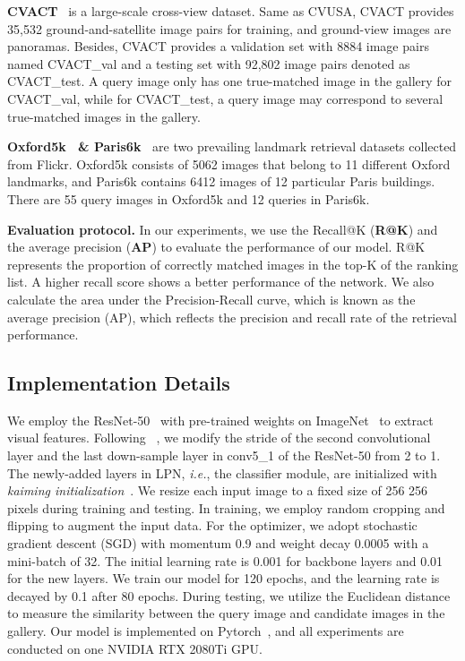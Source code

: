 \documentclass[journal]{IEEEtran}
\def\ie{\emph{i.e.}}
\begin{document}
\textbf{CVACT}~\cite{liu_lending_2019} is a large-scale cross-view dataset. Same as CVUSA, CVACT provides 35,532 ground-and-satellite image pairs for training, and ground-view images are panoramas. Besides, CVACT provides a validation set with 8884 image pairs named CVACT\_val and a testing set with 92,802 image pairs denoted as CVACT\_test. A query image only has one true-matched image in the gallery for CVACT\_val, while for CVACT\_test, a query image may correspond to several true-matched images in the gallery.
\par
\textbf{Oxford5k~\cite{philbin2007object} \& Paris6k~\cite{philbin2008lost}} are two prevailing landmark retrieval datasets collected from Flickr. Oxford5k consists of 5062 images that belong to 11 different Oxford landmarks, and Paris6k contains 6412 images of 12 particular Paris buildings. There are 55 query images in Oxford5k and 12 queries in Paris6k. \par
\textbf{Evaluation protocol.} 
In our experiments, we use the Recall@K (\textbf{R@K}) and the average precision (\textbf{AP}) to evaluate the performance of our model. R@K represents the proportion of correctly matched images in the top-K of the ranking list. A higher recall score shows a better performance of the network. We also calculate the
area under the Precision-Recall curve, which is known
as the average precision (AP), which reflects the
precision and recall rate of the retrieval performance. 
\subsection{Implementation Details} \label{implementation detail}
We employ the ResNet-50~\cite{he2016deep} with pre-trained weights on ImageNet~\cite{5206848} to extract visual features. Following ~\cite{zheng_university-1652_nodate}, we modify the stride of the second convolutional layer and the last down-sample layer in conv5\_1 of the ResNet-50 from 2 to 1. The newly-added layers in LPN, \ie, the classifier module, are initialized with \textit{kaiming initialization}~\cite{kaiming_init}. We resize each input image to a fixed size of 256  256 pixels during training and testing. In training, we employ random cropping and flipping to augment the input data. For the optimizer, we adopt stochastic gradient descent (SGD) with momentum 0.9 and weight decay 0.0005 with a mini-batch of 32. The initial learning rate is 0.001 for backbone layers and 0.01 for the new layers. We train our model for 120 epochs, and the learning rate is decayed by 0.1 after 80 epochs. During testing, we utilize the Euclidean distance to measure the similarity between the query image and candidate images in the gallery. Our model is implemented on Pytorch~\cite{paszke2019pytorch}, and all experiments are conducted on one NVIDIA RTX 2080Ti GPU.
\end{document}
